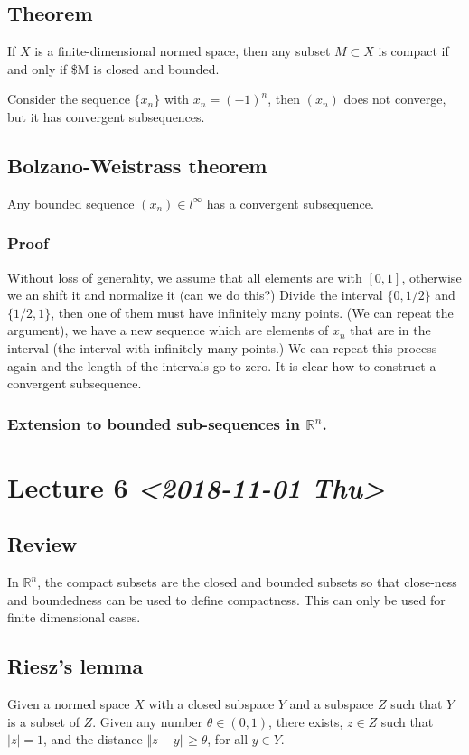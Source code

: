 \documentclass[11pt]{article}
\def\R{\mathbb{R}}
\begin{document}
\subsection{Theorem}
\label{sec:org52875a2}
If \(X\) is a finite-dimensional normed space, then any subset \(M \subset X\)
is compact if and only if \$M is closed and bounded.

Consider the sequence \(\{x_n\}\) with \(x_n = (-1)^n\), then \((x_n)\) does not
converge, but it has convergent subsequences.
\subsection{Bolzano-Weistrass theorem}
\label{sec:org629d8b1}
Any bounded sequence \((x_n) \in l^{\infty}\) has a convergent subsequence.
\subsubsection{Proof}
\label{sec:org693e091}
Without loss of generality, we assume that all elements are with \([0, 1]\),
otherwise we an shift it and normalize it (can we do this?) Divide the
interval \(\{0, 1/2\}\) and \(\{1/2, 1\}\), then one of them must have
infinitely many points. (We can repeat the argument), we have a new sequence
which are elements of \(x_n\) that are in the interval (the interval with
infinitely many points.) We can repeat this process again and the length of
the intervals go to zero. It is clear how to construct a convergent
subsequence.
\subsubsection{Extension to bounded sub-sequences in \(\R^n\).}
\label{sec:orgecc6d1a}
\section{Lecture 6 \textit{<2018-11-01 Thu>}}
\label{sec:orgd7810e2}
\subsection{Review}
\label{sec:org333cb16}
In \(\R^n\), the compact subsets are the closed and bounded subsets so that
close-ness and boundedness can be used to define compactness. This can only
be used for finite dimensional cases.
\subsection{Riesz's lemma}
\label{sec:org00c7ef4}
Given a normed space \(X\) with a closed subspace \(Y\) and a subspace \(Z\) such
that \(Y\) is a subset of \(Z\). Given any number \(\theta\in (0, 1)\), there
exists, \(z\in Z\) such that \(\vert z \vert = 1\), and the distance \(\Vert z - y
   \Vert \ge \theta\), for all \(y \in Y\).
\end{document}
